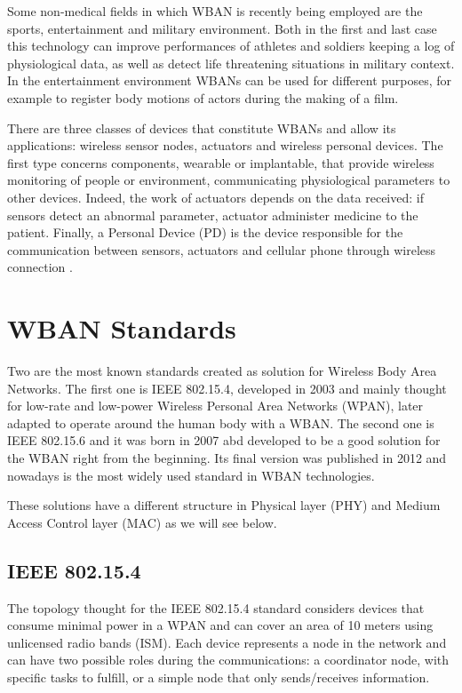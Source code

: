 \documentclass[conference]{IEEEtran}
\begin{document}
Some non-medical fields in which WBAN is recently being employed are the sports, entertainment and military environment. Both in the first and last case this technology can improve performances of athletes and soldiers keeping a log of physiological data, as well as detect life threatening situations in military context. In the entertainment environment WBANs can be used for different purposes, for example to register body motions of actors during the making of a film.

There are three classes of devices that constitute WBANs and allow its applications: wireless sensor nodes, actuators and wireless personal devices. The first type concerns components, wearable or implantable, that provide wireless monitoring of people or environment, communicating physiological parameters to other devices. Indeed, the work of actuators depends on the data received: if sensors detect an abnormal parameter, actuator administer medicine to the patient. Finally, a Personal Device (PD) is the device responsible for the communication between sensors, actuators and cellular phone through wireless connection \cite{salayma2017wireless}.


\section{WBAN Standards}
Two are the most known standards created as solution for Wireless Body Area Networks. The first one is IEEE 802.15.4, developed in 2003 and mainly thought for low-rate and low-power Wireless Personal Area Networks (WPAN), later adapted to operate around the human body with a WBAN. The second one is IEEE 802.15.6 and it was born in 2007 abd developed to be a good solution for the WBAN right from the beginning. Its final version was published in 2012 and nowadays is the most widely used standard in WBAN technologies.

These solutions have a different structure in Physical layer (PHY) and Medium Access Control layer (MAC) as we will see below.


\subsection{IEEE 802.15.4}
The topology thought for the IEEE 802.15.4 standard considers devices that consume minimal power in a WPAN and can cover an area of 10 meters using unlicensed radio bands (ISM). Each device represents a node in the network and can have two possible roles during the communications: a coordinator node, with specific tasks to fulfill, or a simple node that only sends/receives information.
\end{document}
